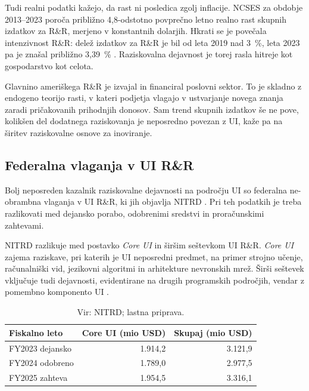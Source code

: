 \documentclass[12pt,a4paper]{article}
\begin{document}
Tudi realni podatki kažejo, da rast ni posledica zgolj inflacije. NCSES za obdobje 2013--2023 poroča približno 4,8-odstotno povprečno letno realno rast skupnih izdatkov za R\&R, merjeno v konstantnih dolarjih. Hkrati se je povečala intenzivnost R\&R: delež izdatkov za R\&R je bil od leta 2019 nad 3~\%, leta 2023 pa je znašal približno 3,39~\% \parencite{ncses2026}. Raziskovalna dejavnost je torej rasla hitreje kot gospodarstvo kot celota.

Glavnino ameriškega R\&R je izvajal in financiral poslovni sektor. To je skladno z endogeno teorijo rasti, v kateri podjetja vlagajo v ustvarjanje novega znanja zaradi pričakovanih prihodnjih donosov. Sam trend skupnih izdatkov še ne pove, kolikšen del dodatnega raziskovanja je neposredno povezan z UI, kaže pa na širitev raziskovalne osnove za inoviranje.

\subsection{Federalna vlaganja v UI R\&R}

Bolj neposreden kazalnik raziskovalne dejavnosti na področju UI so federalna ne-obrambna vlaganja v UI R\&R, ki jih objavlja NITRD \parencite{nitrd2025}. Pri teh podatkih je treba razlikovati med dejansko porabo, odobrenimi sredstvi in proračunskimi zahtevami.

NITRD razlikuje med postavko \emph{Core UI} in širšim seštevkom UI R\&R. \emph{Core UI} zajema raziskave, pri katerih je UI neposredni predmet, na primer strojno učenje, računalniški vid, jezikovni algoritmi in arhitekture nevronskih mrež. Širši seštevek vključuje tudi dejavnosti, evidentirane na drugih programskih področjih, vendar z pomembno komponento UI \parencite{nitrd2025}.

\begin{table}[H]
\centering
\caption{Federalni UI R\&R -- izbrana leta}
\begin{tabular}{lrr}
\toprule
\textbf{Fiskalno leto} & \textbf{Core UI (mio USD)} & \textbf{Skupaj (mio USD)} \\
\midrule
FY2023 dejansko & 1.914,2 & 3.121,9 \\
FY2024 odobreno & 1.789,0 & 2.977,5 \\
FY2025 zahteva & 1.954,5 & 3.316,1 \\
\bottomrule
\end{tabular}
\caption*{\footnotesize Vir: NITRD; lastna priprava.}
\label{tab:UI-rd}
\end{table}
\end{document}
